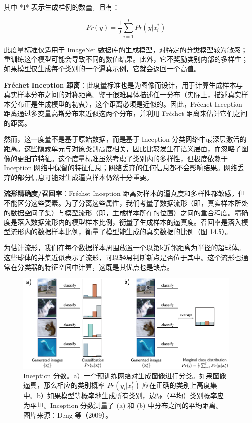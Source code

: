 \documentclass[lang=cn,newtx,10pt,scheme=chinese]{elegantbook}
\begin{document}
其中 *I* 表示生成样例的数量，且有：

\begin{equation}
Pr(y) = \frac{1}{I} \sum_{i=1}^{I} Pr(y|x_i^*)
\end{equation}

此度量标准仅适用于 ImageNet 数据库的生成模型，对特定的分类模型较为敏感；重训练这个模型可能会导致不同的数值结果。此外，它不奖励类别内部的多样性；如果模型仅生成每个类别的一个逼真示例，它就会返回一个高值。

\textbf{Fréchet Inception 距离}：此度量标准也是为图像而设计，用于计算生成样本与真实样本分布之间的对称距离。鉴于很难具体描述任一分布（实际上，描述真实样本分布正是生成模型的初衷），这个距离必须是近似的。因此，Fréchet Inception 距离通过多变量高斯分布来近似这两个分布，并利用 Fréchet 距离来估计它们之间的距离。

然而，这一度量不是基于原始数据，而是基于 Inception 分类网络中最深层激活的距离。这些隐藏单元与对象类别高度相关，因此比较发生在语义层面，而忽略了图像的更细节特征。这个度量标准虽然考虑了类别内的多样性，但极度依赖于 Inception 网络中保留的特征信息；网络丢弃的任何信息都不会影响结果。网络丢弃的部分信息可能对生成逼真样本仍然十分重要。

\textbf{流形精确度/召回率}：Fréchet Inception 距离对样本的逼真度和多样性都敏感，但不能区分这些要素。为了分离这些属性，我们考量了数据流形（即，真实样本所处的数据空间子集）与模型流形（即，生成样本所在的位置）之间的重合程度。精确度是落入数据流形内的模型样本比例，衡量了生成样本的逼真度。召回率是落入模型流形内的数据样本比例，衡量了模型能生成的真实数据的比例（图 14.5）。

为估计流形，我们在每个数据样本周围放置一个以第k近邻距离为半径的超球体。这些球体的并集近似表示了流形，可以轻易判断新点是否位于其中。这个流形也通常在分类器的特征空间中计算，这既是其优点也是缺点。

\begin{figure}[ht!]
\centering
\includegraphics[width=0.7\linewidth]{PDFFigures/UDLChap14PDF/UnsupInception.pdf}
\caption{Inception 分数。a）一个预训练网络对生成图像进行分类。如果图像逼真，那么相应的类别概率 \(Pr(y_i | x^*_i)\) 应在正确的类别上高度集中。b）如果模型等概率地生成所有类别，边际（平均）类别概率应为平坦。Inception 分数测量了 (a) 和 (b) 中分布之间的平均距离。图片来源：Deng 等（2009）。}
\end{figure}
\end{document}
